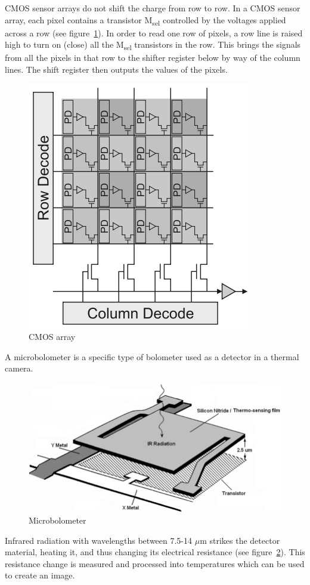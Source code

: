 CMOS sensor arrays do not shift the charge from row to row.
%
In a CMOS sensor array, each pixel contains a transistor M\textsubscript{sel} controlled by the voltages applied across a row (see figure~\ref{fig:cmosarray}).
%
In order to read one row of pixels, a row line is raised high to turn on (close) all the M\textsubscript{sel} transistors in the row.
%
This brings the signals from all the pixels in that row to the shifter register below by way of the column lines.
%
The shift register then outputs the values of the pixels.
\begin{figure}
    \center
    \includegraphics[width=.6\linewidth,keepaspectratio]{figures/cmod.png}
    \caption{CMOS array}
    \label{fig:cmosarray}
\end{figure}

A microbolometer is a specific type of bolometer used as a detector in a thermal camera.
\begin{figure}
    \center
    \includegraphics[width=\linewidth,keepaspectratio]{figures/microbolometer.png}
    \caption{Microbolometer\cite{bolometer}}
    \label{fig:microbolometer}
\end{figure}
%
Infrared radiation with wavelengths between 7.5-14 $\mu$m strikes the detector material, heating it, and thus changing its electrical resistance (see figure~\ref{fig:microbolometer}).
%
This resistance change is measured and processed into temperatures which can be used to create an image.

